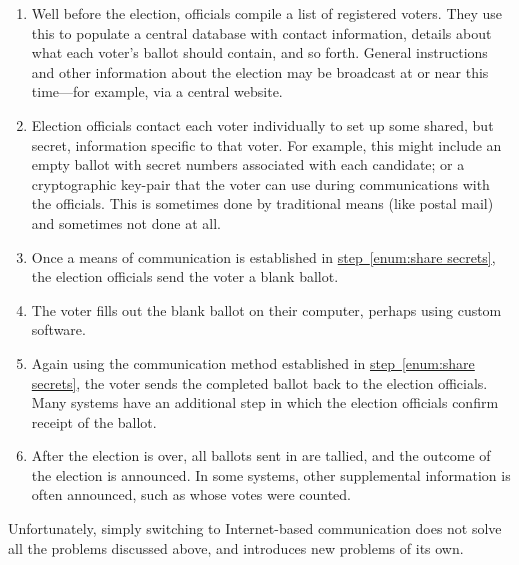 \newcommand\stepref[1]{\hyperref[#1]{step~\ref*{#1}}}
\begin{enumerate}
  \item\label{enum:setup} Well before the election, officials compile a list
    of registered voters. They use this to populate a central database with
    contact information, details about what each voter's ballot should
    contain, and so forth. General instructions and other information about
    the election may be broadcast at or near this time---for example, via a
    central website.
  \item\label{enum:share secrets} Election officials contact each voter
    individually to set up some shared, but secret, information specific to
    that voter. For example, this might include an empty ballot with secret
    numbers associated with each candidate; or a cryptographic key-pair that
    the voter can use during communications with the officials. This is
    sometimes done by traditional means (like postal mail) and sometimes not
    done at all.
  \item\label{enum:send blank ballot} Once a means of communication is
    established in \stepref{enum:share secrets}, the election officials send
    the voter a blank ballot.
  \item\label{enum:complete ballot} The voter fills out the blank ballot on
    their computer, perhaps using custom software.
  \item\label{enum:send completed ballot} Again using the communication
    method established in \stepref{enum:share secrets}, the voter sends the
    completed ballot back to the election officials. Many systems have an
    additional step in which the election officials confirm receipt of the
    ballot.
  \item\label{enum:tally} After the election is over, all ballots sent in
    are tallied, and the outcome of the election is announced. In some
    systems, other supplemental information is often announced, such as
    whose votes were counted.
\end{enumerate}

Unfortunately, simply switching to Internet-based communication does not
solve all the problems discussed above, and introduces new problems of its
own.

